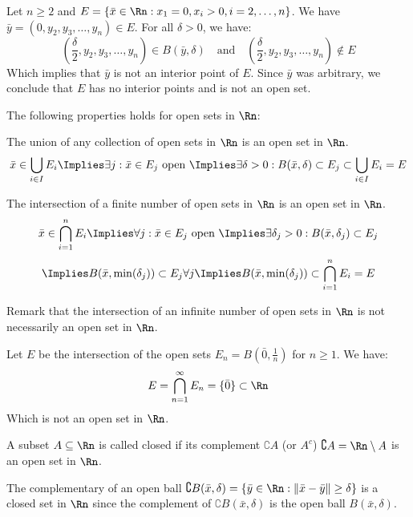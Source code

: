 \begin{eg}
    Let $n \geq 2$ and $E = \{\bar{x} \in \Rn : x_1 = 0, x_i > 0, i = 2, \ldots, n\}$. We have $\bar{y} = (0, y_2, y_3, \ldots, y_n) \in E$. For all $\delta > 0$, we have:
    \[
        \left(\frac{\delta}{2}, y_2, y_3, \ldots, y_n\right) \in B(\bar{y}, \delta) \quad \text{and} \quad \left(\frac{\delta}{2}, y_2, y_3, \ldots, y_n\right) \notin E
    \]
    Which implies that $\bar{y}$ is not an interior point of $E$. Since $\bar{y}$ was arbitrary, we conclude that $E$ has no interior points and is not an open set.
\end{eg}
The following properties holds for open sets in $\Rn$:
\begin{citemize}
    \item The union of any collection of open sets in $\Rn$ is an open set in $\Rn$.
    \[
        \bar{x} \in \bigcup_{i \in I} E_i \Implies \exists j : \bar{x} \in E_j \text{ open } \Implies \exists \delta > 0 : B(\bar{x}, \delta) \subset E_j \subset \bigcup_{i \in I} E_i = E
    \]
    \item The intersection of a finite number of open sets in $\Rn$ is an open set in $\Rn$.
    \[
        \bar{x} \in \bigcap_{i = 1}^n E_i \Implies \forall j : \bar{x} \in E_j \text{ open } \Implies \exists \delta_j > 0 : B(\bar{x}, \delta_j) \subset E_j
    \]
    \[
        \Implies B(\bar{x}, \min(\delta_j)) \subset E_j \forall j \Implies B(\bar{x}, \min(\delta_j)) \subset \bigcap_{i = 1}^n E_i = E
    \]
\end{citemize}
Remark that the intersection of an infinite number of open sets in $\Rn$ is not necessarily an open set in $\Rn$.
\begin{eg}
    Let $E$ be the intersection of the open sets $E_n = B(\bar{0}, \frac{1}{n})$ for $n \geq 1$. We have:
    \[
        E = \bigcap_{n = 1}^{\infty} E_n = \{\bar{0}\} \subset \Rn
    \]
    Which is not an open set in $\Rn$.
\end{eg}

\begin{definition}
    A subset $A \subseteq \Rn$ is called closed if its complement $\complement A$ (or $A^c$) $\complement A = \Rn \setminus A$ is an open set in $\Rn$.
\end{definition}

\begin{eg}
    The complementary of an open ball $\complement B(\bar{x}, \delta) = \{\bar{y} \in \Rn : \|\bar{x} - \bar{y} \| \geq \delta\}$ is a closed set in $\Rn$ since the complement of $\complement B(\bar{x}, \delta)$ is the open ball $B(\bar{x}, \delta)$.
\end{eg}

